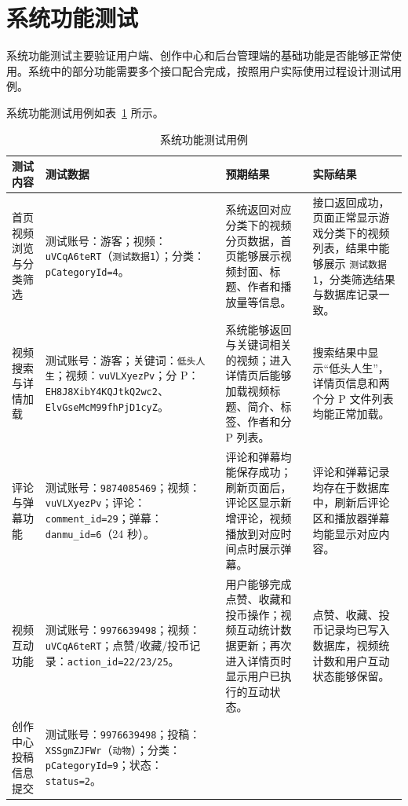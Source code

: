 \section{系统功能测试}
\label{sec:system-function-test}

系统功能测试主要验证用户端、创作中心和后台管理端的基础功能是否能够正常使用。系统中的部分功能需要多个接口配合完成，按照用户实际使用过程设计测试用例。

系统功能测试用例如表~\ref{tab:system-function-test} 所示。

\begin{table}[!htbp]
	\centering
	\small
	\setlength{\tabcolsep}{4pt}
	\renewcommand{\arraystretch}{1.35}
	\caption{系统功能测试用例}
	\label{tab:system-function-test}
	\begin{tabular}{p{}p{}p{}p{}}
		\hline
		\textbf{测试内容} & \textbf{测试数据} & \textbf{预期结果} & \textbf{实际结果} \\
		\hline
		首页视频浏览与分类筛选 &
		测试账号：游客；视频：\texttt{uVCqA6teRT}（\texttt{测试数据1}）；分类：\texttt{pCategoryId=4}。 &
		系统返回对应分类下的视频分页数据，首页能够展示视频封面、标题、作者和播放量等信息。 &
		接口返回成功，页面正常显示游戏分类下的视频列表，结果中能够展示 \texttt{测试数据1}，分类筛选结果与数据库记录一致。 \\
		\hline
		视频搜索与详情加载 &
		测试账号：游客；关键词：\texttt{低头人生}；视频：\texttt{vuVLXyezPv}；分 P：\texttt{EH8J8XibY4KQJtkQ2wc2}、\texttt{ElvGseMcM99fhPjD1cyZ}。 &
		系统能够返回与关键词相关的视频；进入详情页后能够加载视频标题、简介、标签、作者和分 P 列表。 &
		搜索结果中显示“低头人生”，详情页信息和两个分 P 文件列表均能正常加载。 \\
		\hline
		评论与弹幕功能 &
		测试账号：\texttt{9874085469}；视频：\texttt{vuVLXyezPv}；评论：\texttt{comment\_id=29}；弹幕：\texttt{danmu\_id=6}（24 秒）。 &
		评论和弹幕均能保存成功；刷新页面后，评论区显示新增评论，视频播放到对应时间点时展示弹幕。 &
		评论和弹幕记录均存在于数据库中，刷新后评论区和播放器弹幕均能显示对应内容。 \\
		\hline
		视频互动功能 &
		测试账号：\texttt{9976639498}；视频：\texttt{uVCqA6teRT}；点赞/收藏/投币记录：\texttt{action\_id=22/23/25}。 &
		用户能够完成点赞、收藏和投币操作；视频互动统计数据更新；再次进入详情页时显示用户已执行的互动状态。 &
		点赞、收藏、投币记录均已写入数据库，视频统计数和用户互动状态能够保留。 \\
		\hline
		创作中心投稿信息提交 &
		测试账号：\texttt{9976639498}；投稿：\texttt{XSSgmZJFWr}（\texttt{动物}）；分类：\texttt{pCategoryId=9}；状态：\texttt{status=2}。 &

\end{tabular}
\end{table}
